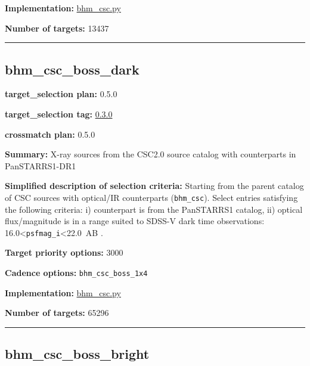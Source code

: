 \noindent\textbf{Implementation:}
\href{https://github.com/sdss/target_selection/blob/0.3.0/python/target_selection/cartons/bhm_csc.py}{bhm\_csc.py}

\noindent\textbf{Number of targets:} 13437

\begin{center}\rule{0.5\linewidth}{0.5pt}\end{center}

\hypertarget{bhm_csc_boss_dark_plan0.5.0}{%
\subsection{bhm\_csc\_boss\_dark}\label{bhm_csc_boss_dark_plan0.5.0}}

\noindent\textbf{target\_selection plan:} 0.5.0

\noindent\textbf{target\_selection tag:}
\href{https://github.com/sdss/target_selection/tree/0.3.0/}{0.3.0}

\noindent\textbf{crossmatch plan:} 0.5.0

\noindent\textbf{Summary:} X-ray sources from the CSC2.0 source catalog with
counterparts in PanSTARRS1-DR1

\noindent\textbf{Simplified description of selection criteria:} Starting from the
parent catalog of CSC sources with optical/IR counterparts
(\texttt{bhm\_csc}). Select entries satisfying the following criteria:
i) counterpart is from the PanSTARRS1 catalog, ii) optical
flux/magnitude is in a range suited to SDSS-V dark time observations:
16.0\textless{}\texttt{psfmag\_i}\textless22.0~AB .


\noindent\textbf{Target priority options:} 3000

\noindent\textbf{Cadence options:} \texttt{bhm\_csc\_boss\_1x4}

\noindent\textbf{Implementation:}
\href{https://github.com/sdss/target_selection/blob/0.3.0/python/target_selection/cartons/bhm_csc.py}{bhm\_csc.py}

\noindent\textbf{Number of targets:} 65296

\begin{center}\rule{0.5\linewidth}{0.5pt}\end{center}

\hypertarget{bhm_csc_boss_bright_plan0.5.0}{%
\subsection{bhm\_csc\_boss\_bright}\label{bhm_csc_boss_bright_plan0.5.0}}


